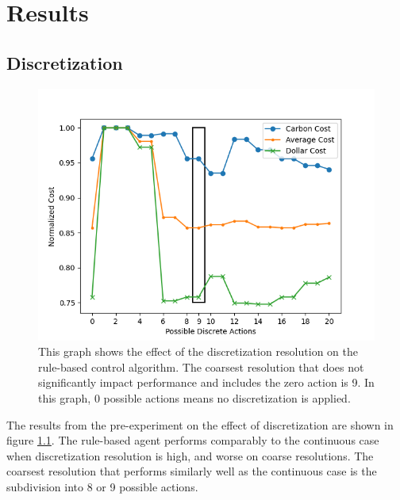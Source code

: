 \chapter{Results}
  \label{results}

\section{Discretization}
\begin{figure}[h]
  \centering
  \includegraphics[width=\figurewidth]{figures/discretization.png}
  \caption{This graph shows the effect of the discretization resolution on the rule-based control algorithm. The coarsest resolution that does not significantly impact performance and includes the zero action is 9. In this graph, 0 possible actions means no discretization is applied.}
  \label{fig:discretization}
\end{figure}

The results from the pre-experiment on the effect of discretization are shown in figure \ref{fig:discretization}.
The rule-based agent performs comparably to the continuous case when discretization resolution is high, and worse on coarse resolutions. The coarsest resolution that performs similarly well as the continuous case is the subdivision into 8 or 9 possible actions.

